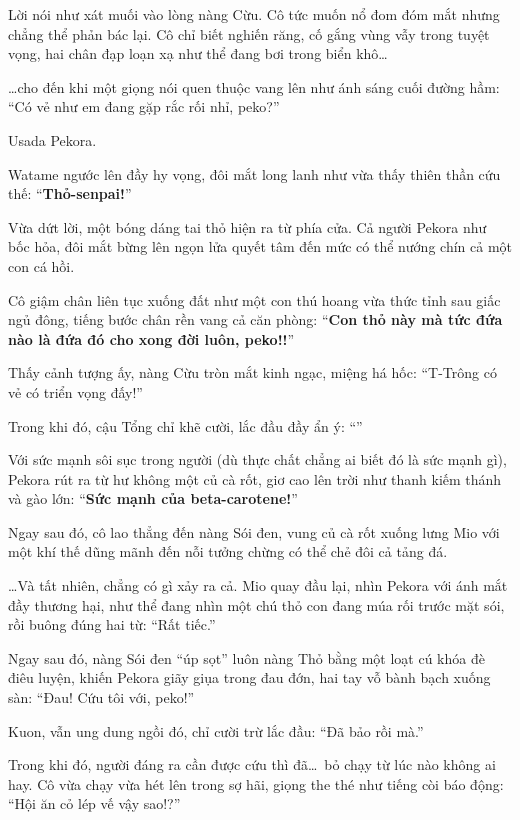\documentclass[../main.tex]{subfiles}
\begin{document}
Lời nói như xát muối vào lòng nàng Cừu. Cô tức muốn nổ đom đóm mắt nhưng chẳng thể phản bác lại. Cô chỉ biết nghiến răng, cố gắng vùng vẫy trong tuyệt vọng, hai chân đạp loạn xạ như thể đang bơi trong biển khô\dots

\dots cho đến khi một giọng nói quen thuộc vang lên như ánh sáng cuối đường hầm: ``Có vẻ như em đang gặp rắc rối nhỉ, peko?''

Usada Pekora.

Watame ngước lên đầy hy vọng, đôi mắt long lanh như vừa thấy thiên thần cứu thế: ``\textbf{Thỏ-senpai!}''

Vừa dứt lời, một bóng dáng tai thỏ hiện ra từ phía cửa. Cả người Pekora như bốc hỏa, đôi mắt bừng lên ngọn lửa quyết tâm đến mức có thể nướng chín cả một con cá hồi.


Cô giậm chân liên tục xuống đất như một con thú hoang vừa thức tỉnh sau giấc ngủ đông, tiếng bước chân rền vang cả căn phòng: ``\textbf{Con thỏ này mà tức đứa nào là đứa đó cho xong đời luôn, peko!!}''

Thấy cảnh tượng ấy, nàng Cừu tròn mắt kinh ngạc, miệng há hốc: ``T-Trông có vẻ có triển vọng đấy!''

Trong khi đó, cậu Tổng chỉ khẽ cười, lắc đầu đầy ẩn ý: ``''

Với sức mạnh sôi sục trong người (dù thực chất chẳng ai biết đó là sức mạnh gì), Pekora rút ra từ hư không một củ cà rốt, giơ cao lên trời như thanh kiếm thánh và gào lớn: ``\textbf{Sức mạnh của beta-carotene!}''

Ngay sau đó, cô lao thẳng đến nàng Sói đen, vung củ cà rốt xuống lưng Mio với một khí thế dũng mãnh đến nỗi tưởng chừng có thể chẻ đôi cả tảng đá.

\dots Và tất nhiên, chẳng có gì xảy ra cả. Mio quay đầu lại, nhìn Pekora với ánh mắt đầy thương hại, như thể đang nhìn một chú thỏ con đang múa rối trước mặt sói, rồi buông đúng hai từ: ``Rất tiếc.''

Ngay sau đó, nàng Sói đen ``úp sọt'' luôn nàng Thỏ bằng một loạt cú khóa đè điêu luyện, khiến Pekora giãy giụa trong đau đớn, hai tay vỗ bành bạch xuống sàn: ``Đau! Cứu tôi với, peko!''

Kuon, vẫn ung dung ngồi đó, chỉ cười trừ lắc đầu: ``Đã bảo rồi mà.''

Trong khi đó, người đáng ra cần được cứu thì đã\dots\ bỏ chạy từ lúc nào không ai hay. Cô vừa chạy vừa hét lên trong sợ hãi, giọng the thé như tiếng còi báo động: ``Hội ăn cỏ lép vế vậy sao!?''
\end{document}
